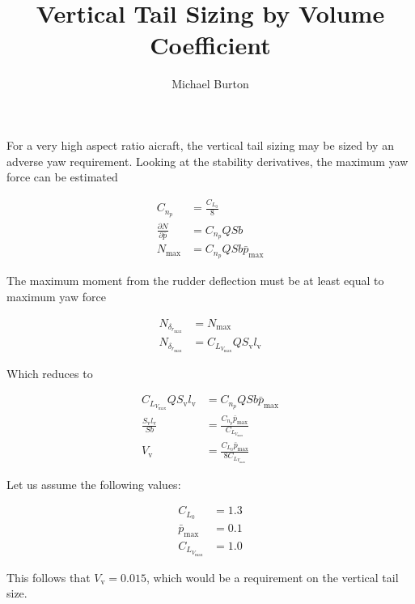 \documentclass[10pt, a4paper]{article}
\begin{document}
\title{Vertical Tail Sizing by Volume Coefficient}
\author{Michael Burton}
\maketitle

For a very high aspect ratio aicraft, the vertical tail sizing may be sized by an adverse yaw requirement.  Looking at the stability derivatives, the maximum yaw force can be estimated

\begin{align}
    C_{n_p} &= \frac{C_{L_0}}{8} \\
    \frac{\partial N}{\partial \bar{p}} &= C_{n_p} Q Sb \\
    N_{\mathrm{max}} &= C_{n_p} Q S b \bar{p}_{\mathrm{max}}
\end{align}

The maximum moment from the rudder deflection must be at least equal to maximum yaw force

\begin{align}
    N_{\delta_{r_{\max}}} &= N_{\mathrm{max}} \\
    N_{\delta_{r_{\max}}} &= C_{L_{V_{\mathrm{max}}}} Q S_{\mathrm{v}} l_{\mathrm{v}}
\end{align}

Which reduces to 

\begin{align}
    C_{L_{V_{\max}}} Q S_{\mathrm{v}} l_{\mathrm{v}} &= C_{n_p} Q S b \bar{p}_{\max} \\
    \frac{S_{\mathrm{v}} l_{\mathrm{v}}}{Sb} &= \frac{C_{n_p} \bar{p}_{\max}}{C_{L_{V_{\max}}}} \\
    V_{\mathrm{v}} &= \frac{C_{L_0} \bar{p}_{\max}}{8 C_{L_{V_{\max}}}}
\end{align}

Let us assume the following values:

\begin{align}
    C_{L_0} &= 1.3 \\
    \bar{p}_{\max} &= 0.1 \\
    C_{L_{V_{\max}}} &= 1.0 
\end{align}

This follows that $V_{\mathrm{v}} = 0.015$, which would be a requirement on the vertical tail size.  
\end{document}
